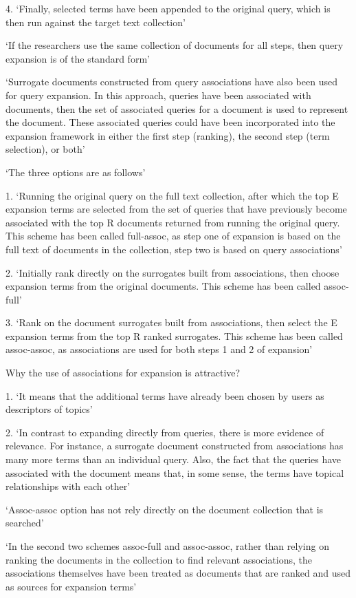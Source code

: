 \documentclass[]{article}
\begin{document}
{{4.	‘Finally, selected terms have been appended to the original query, which is then run against the target text collection’

‘If the researchers use the same collection of documents for all steps, then query expansion is of the standard form’ 

‘Surrogate documents constructed from query associations have also been used for query expansion. In this approach, queries have been associated with documents, then the set of associated queries for a document is used to represent the document. These associated queries could have been incorporated into the expansion framework in either the first step (ranking), the second step (term selection), or both’

‘The three options are as follows’

1.	‘Running the original query on the full text collection, after which the top E expansion terms are selected from the set of queries that have previously become associated with the top R documents returned from running the original query. This scheme has been called full-assoc, as step one of expansion is based on the full text of documents in the collection, step two is based on query associations’

2.	‘Initially rank directly on the surrogates built from associations, then choose expansion terms from the original documents. This scheme has been called assoc-full’

3.	‘Rank on the document surrogates built from associations, then select the E expansion terms from the top R ranked surrogates. This scheme has been called assoc-assoc, as associations are used for both steps 1 and 2 of expansion’

Why the use of associations for expansion is attractive?

1.	‘It means that the additional terms have already been chosen by users as descriptors of topics’

2.	‘In contrast to expanding directly from queries, there is more evidence of relevance. For instance, a surrogate document constructed from associations has many more terms than an individual query. Also, the fact that the queries have associated with the document means that, in some sense, the terms have topical relationships with each other’
 
‘Assoc-assoc option has not rely directly on the document collection that is searched’

‘In the second two schemes assoc-full and assoc-assoc, rather than relying on ranking the documents in the collection to find relevant associations, the associations themselves have been treated as documents that are ranked and used as sources for expansion terms’

}}
\end{document}
